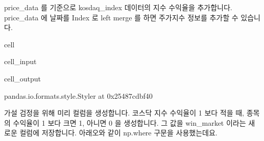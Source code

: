 \documentclass[letterpaper,10pt,english]{jupyterBook}
\begin{document}
\sphinxAtStartPar
price\_data 를 기준으로 kosdaq\_index 데이터의 지수 수익율을 추가합니다. price\_data 에 날짜를 Index 로 left merge 를 하면 주가지수 정보를 추가할 수 있습니다.

\begin{sphinxuseclass}{cell}\begin{sphinxVerbatimInput}

\begin{sphinxuseclass}{cell_input}
\begin{sphinxVerbatim}[commandchars=\\\{\}]
  \PYG{p}{[}\PYG{p}{]}   
\end{sphinxVerbatim}

\end{sphinxuseclass}\end{sphinxVerbatimInput}
\begin{sphinxVerbatimOutput}

\begin{sphinxuseclass}{cell_output}
\begin{sphinxVerbatim}[commandchars=\\\{\}]
\PYGZlt{}pandas.io.formats.style.Styler at 0x25487cdbf40\PYGZgt{}
\end{sphinxVerbatim}

\end{sphinxuseclass}\end{sphinxVerbatimOutput}

\end{sphinxuseclass}
\sphinxAtStartPar
가설 검정을 위해 미리 컬럼을 생성합니다. 코스닥 지수 수익율이 1 보다 적을 때, 종목의 수익율이 1 보다 크면 1, 아니면 0 을 생성합니다. 그 값을 win\_market 이라는 새로운 컬럼에 저장합니다. 아래오와 같이 np.where 구문을 사용했는데요.

\begin{sphinxVerbatim}[commandchars=\\\{\}]
\PYG{p}{[}\PYG{p}{]}    
\end{sphinxVerbatim}
\end{document}

